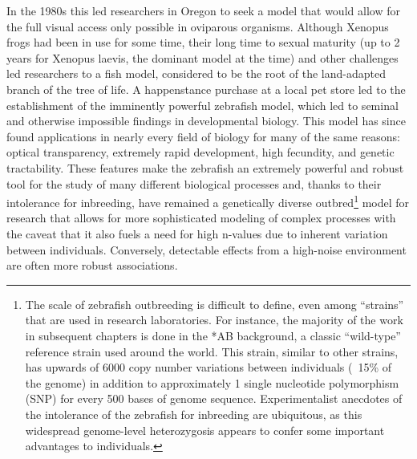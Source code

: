 In the 1980s this led researchers in Oregon to seek a model that would allow for the full visual access only possible in oviparous organisms. Although Xenopus frogs had been in use for some time, their long time to sexual maturity (up to 2 years for Xenopus laevis, the dominant model at the time) and other challenges led researchers to a fish model, considered to be the root of the land-adapted branch of the tree of life. A happenstance purchase at a local pet store led to the establishment of the imminently powerful zebrafish model, which led to seminal and otherwise impossible findings in developmental biology. This model has since found applications in nearly every field of biology for many of the same reasons: optical transparency, extremely rapid development, high fecundity, and genetic tractability. These features make the zebrafish an extremely powerful and robust tool for the study of many different biological processes and, thanks to their intolerance for inbreeding, have remained a genetically diverse outbred\footnote{The scale of zebrafish outbreeding is difficult to define, even among “strains” that are used in research laboratories. For instance, the majority of the work in subsequent chapters is done in the *AB background, a classic “wild-type” reference strain used around the world. This strain, similar to other strains, has upwards of 6000 copy number variations between individuals (~15\% of the genome) in addition to approximately 1 single nucleotide polymorphism (SNP) for every 500 bases of genome sequence. Experimentalist anecdotes of the intolerance of the zebrafish for inbreeding are ubiquitous, as this widespread genome-level heterozygosis appears to confer some important advantages to individuals.} model for research that allows for more sophisticated modeling of complex processes with the caveat that it also fuels a need for high n-values due to inherent variation between individuals. Conversely, detectable effects from a high-noise environment are often more robust associations.

